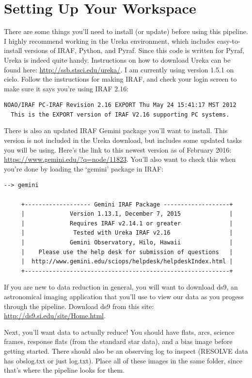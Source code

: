 \documentclass[12pt]{report}
\begin{document}
\chapter{Setting Up Your Workspace}

There are some things you'll need to install (or update) before using this pipeline. I highly recommend working in the Ureka environment, which includes easy-to-install versions of IRAF, Python, and Pyraf. Since this code is written for Pyraf, Ureka is indeed quite handy. Instructions on how to download Ureka can be found here: \url{http://ssb.stsci.edu/ureka/}. I am currently using version 1.5.1 on cielo. Follow the instructions for making IRAF, and check your login screen to make sure it says you're using IRAF 2.16:

\begin{verbatim}
NOAO/IRAF PC-IRAF Revision 2.16 EXPORT Thu May 24 15:41:17 MST 2012
  This is the EXPORT version of IRAF V2.16 supporting PC systems.
\end{verbatim}

There is also an updated IRAF Gemini package you'll want to install. This version is not included in the Ureka download, but includes some updated tasks you will be using. Here's the link to this newest version as of February 2016: \url{https://www.gemini.edu/?q=node/11823}. You'll also want to check this when you're done by loading the `gemini' package in IRAF:

\begin{verbatim}
--> gemini

     +------------------- Gemini IRAF Package -------------------+
     |             Version 1.13.1, December 7, 2015              |
     |             Requires IRAF v2.14.1 or greater              |
     |              Tested with Ureka IRAF v2.16                 |
     |             Gemini Observatory, Hilo, Hawaii              |
     |    Please use the help desk for submission of questions   |
     |  http://www.gemini.edu/sciops/helpdesk/helpdeskIndex.html |
     +-----------------------------------------------------------+
\end{verbatim}


If you are new to data reduction in general, you will want to download ds9, an astronomical imaging application that you'll use to view our data as you progess through the pipeline. Download ds9 from this site: \url{http://ds9.si.edu/site/Home.html}.

Next, you'll want data to actually reduce! You should have flats, arcs, science frames, response flats (from the standard star data), and a bias image before getting started. There should also be an observing log to inspect (RESOLVE data has obslog.txt or just log.txt). Place all of these images in the same folder, since that's where the pipeline looks for them. 
\end{document}
